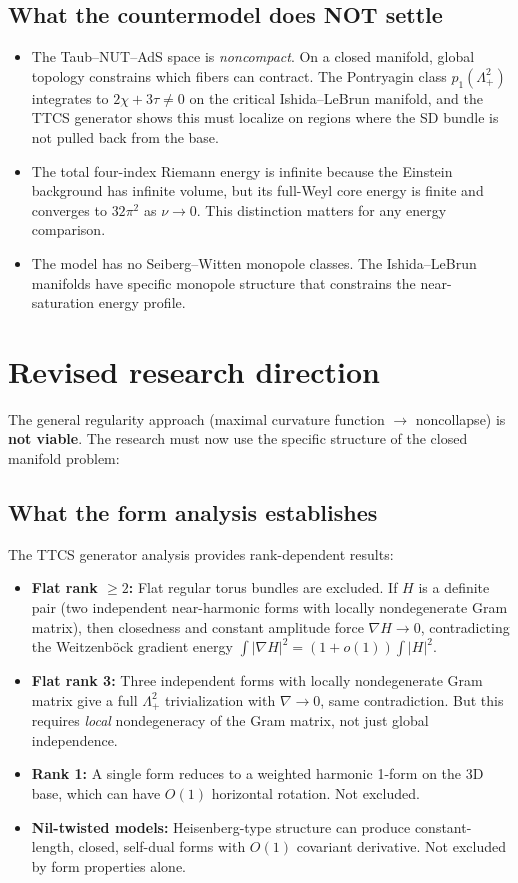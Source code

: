 \subsection{What the countermodel does NOT settle}
\begin{itemize}
\item The Taub--NUT--AdS space is \emph{noncompact}.
On a closed manifold, global topology constrains which fibers
can contract. The Pontryagin class $p_1(\Lambda^2_+)$ integrates to
$2\chi+3\tau \ne 0$ on the critical Ishida--LeBrun manifold,
and the TTCS generator shows this must localize on regions
where the SD bundle is not pulled back from the base.
\item The total four-index Riemann energy is infinite because the Einstein
background has infinite volume, but its full-Weyl core energy is finite and
converges to $32\pi^2$ as $\nu\to0$.  This distinction matters for any
energy comparison.
\item The model has no Seiberg--Witten monopole classes.
The Ishida--LeBrun manifolds have specific monopole structure
that constrains the near-saturation energy profile.
\end{itemize}

\section{Revised research direction}

The general regularity approach (maximal curvature function $\to$ noncollapse)
is \textbf{not viable}. The research must now use the specific structure
of the closed manifold problem:

\subsection{What the form analysis establishes}
The TTCS generator analysis provides rank-dependent results:
\begin{itemize}
\item \textbf{Flat rank $\ge 2$:}
Flat regular torus bundles are excluded.
If $H$ is a definite pair (two independent near-harmonic forms with locally
nondegenerate Gram matrix), then closedness and constant amplitude
force $\nabla H \to 0$, contradicting the Weitzenb\"ock gradient energy
$\int|\nabla H|^2 = (1+o(1))\int|H|^2$.
\item \textbf{Flat rank 3:}
Three independent forms with locally nondegenerate Gram matrix
give a full $\Lambda^2_+$ trivialization with $\nabla \to 0$,
same contradiction. But this requires \emph{local} nondegeneracy
of the Gram matrix, not just global independence.
\item \textbf{Rank 1:}
A single form reduces to a weighted harmonic 1-form on the
3D base, which can have $O(1)$ horizontal rotation. Not excluded.
\item \textbf{Nil-twisted models:}
Heisenberg-type structure can produce constant-length, closed,
self-dual forms with $O(1)$ covariant derivative.
Not excluded by form properties alone.
\end{itemize}

